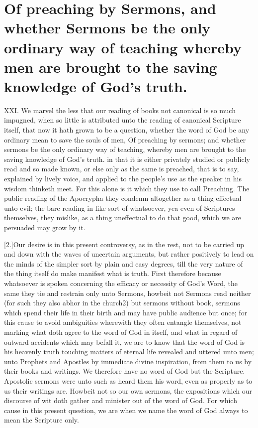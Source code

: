 \section*{Of preaching by Sermons, and whether Sermons be the only ordinary way of teaching whereby men are brought to the saving knowledge of God’s truth.}
XXI. We marvel the less that our reading of books not canonical is so much impugned, when so little is attributed unto the reading of canonical Scripture itself, that now it hath grown to be a question, whether the word of God be any ordinary mean to save the souls of men,
Of preaching by sermons; and whether sermons be the only ordinary way of teaching, whereby men are brought to the saving knowledge of God’s truth.
 in that it is either privately studied or publicly read and so made known, or else only as the same is preached, that is to say, explained by lively voice, and applied to the people’s use as the speaker in his wisdom thinketh meet. For this alone is it which they use to call Preaching. The public reading of the Apocrypha they condemn altogether as a thing effectual unto evil; the bare reading in like sort of whatsoever, yea even of Scriptures themselves, they mislike, as a thing uneffectual to do that good, which we are persuaded may grow by it.

[2.]Our desire is in this present controversy, as in the rest, not to be carried up and down with the waves of uncertain arguments, but rather positively to lead on the minds of the simpler sort by plain and easy degrees, till the very nature of the thing itself do make manifest what is truth. First therefore because whatsoever is spoken concerning the efficacy or necessity of God’s Word, the same they tie and restrain only unto Sermons, howbeit not Sermons read neither (for such they also abhor in the church2) but sermons without book, sermons which spend their life in their birth and may have public audience but once; for this cause to avoid ambiguities wherewith they often entangle themselves, not marking what doth agree to the word of God in itself, and what in regard of  outward accidents which may befall it,
 we are to know that the word of God is his heavenly truth touching matters of eternal life revealed and uttered unto men; unto Prophets and Apostles by immediate divine inspiration, from them to us by their books and writings. We therefore have no word of God but the Scripture. Apostolic sermons were unto such as heard them his word, even as properly as to us their writings are. Howbeit not so our own sermons, the expositions which our discourse of wit doth gather and minister out of the word of God. For which cause in this present question, we are when we name the word of God always to mean the Scripture only.

